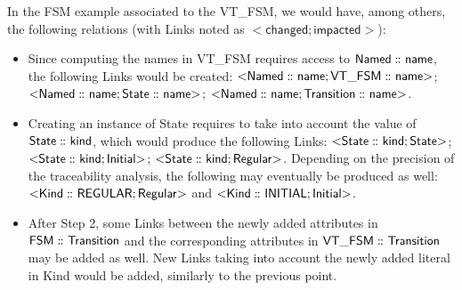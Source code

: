 In the \textsf{FSM} example associated to the \textsf{VT\_FSM},
we would have, among others, the following relations (with \textsf{Link}s noted 
as $\mathsf{<} \mathsf{changed} ; \mathsf{impacted} \mathsf{>}$):
\begin{itemize}
	\item Since computing the \textsf{name}s in \textsf{VT\_FSM} requires access
	to $\mathsf{Named \,\colon\!\!\!\colon name}$, the following \textsf{Link}s would be
	created: 
	$\mathsf{<} \mathsf{Named \,\colon\!\!\!\colon name} ; \mathsf{VT\_FSM \,\colon\!\!\!\colon name} \mathsf{>}$;
	$\mathsf{<} \mathsf{Named \,\colon\!\!\!\colon name} ; \mathsf{State \,\colon\!\!\!\colon name} \mathsf{>}$;
	$\mathsf{<} \mathsf{Named \,\colon\!\!\!\colon name} ; \mathsf{Transition \,\colon\!\!\!\colon name} \mathsf{>}$.

	\item Creating an instance of \textsf{State} requires to take into account
	the value of $\mathsf{State \,\colon\!\!\!\colon kind}$, which would produce the following
	\textsf{Link}s: 
	$\mathsf{<} \mathsf{State \,\colon\!\!\!\colon kind} ; \mathsf{State} \mathsf{>}$;
	$\mathsf{<} \mathsf{State \,\colon\!\!\!\colon kind} ; \mathsf{Initial} \mathsf{>}$;
	$\mathsf{<} \mathsf{State \,\colon\!\!\!\colon kind} ; \mathsf{Regular} \mathsf{>}$.
	Depending on the precision of the traceability analysis, the following may
	eventually be produced as well: 
	$\mathsf{<} \mathsf{Kind \,\colon\!\!\!\colon REGULAR} ; \mathsf{Regular} \mathsf{>}$ and
	$\mathsf{<} \mathsf{Kind \,\colon\!\!\!\colon INITIAL} ; \mathsf{Initial} \mathsf{>}$.
	


	\item After Step 2, some \textsf{Link}s between the newly added attributes
	in $\mathsf{FSM \,\colon\!\!\!\colon Transition}$ and the corresponding attributes in 
	$\mathsf{VT\_FSM \,\colon\!\!\!\colon Transition}$ may be added as well. New 
	\textsf{Link}s taking into account the newly added literal in \textsf{Kind}
	would be added, similarly to the previous point.
\end{itemize}